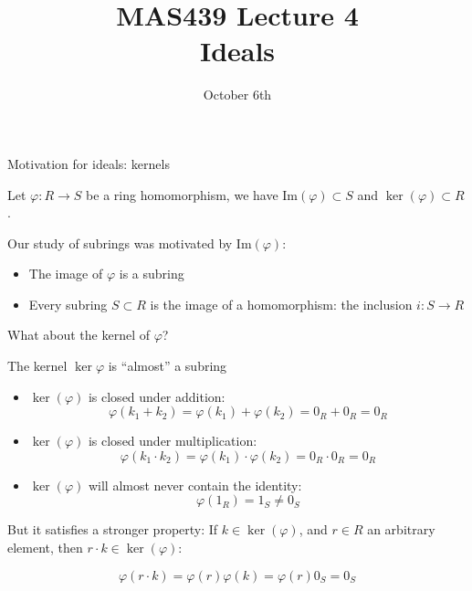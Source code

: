\documentclass{beamer}
\title{MAS439 Lecture 4 \\ Ideals}
\date{October 6th}
\begin{document}
\begin{frame}
\titlepage
\end{frame}


\begin{frame}{Motivation for ideals: kernels}

Let $\varphi:R\to S$ be a ring homomorphism, we have $\textrm{Im}(\varphi)\subset S$ and $\ker(\varphi)\subset R$.

\begin{block}{Our study of subrings was motivated by $\textrm{Im}(\varphi)$:}
\begin{itemize}
\item The image of $\varphi$ is a subring
\item Every subring $S\subset R$ is the image of a homomorphism: the inclusion $i:S\to R$
\end{itemize}
\end{block}

\begin{block}{What about the kernel of $\varphi$?}
\end{block}

\end{frame}


\begin{frame}{The kernel $\ker{\varphi}$ is ``almost'' a subring}

\begin{itemize}
\item $\ker(\varphi)$ is closed under addition: 
$$\varphi(k_1+k_2)=\varphi(k_1)+\varphi(k_2)=0_R+0_R=0_R$$
\item $\ker(\varphi)$ is closed under multiplication:
$$\varphi(k_1\cdot k_2)=\varphi(k_1)\cdot \varphi(k_2)=0_R\cdot 0_R=0_R$$
\item $\ker(\varphi)$ will \alert{almost never} contain the identity:
$$\varphi(1_R)=1_S\neq 0_S$$
\end{itemize}

\begin{block}{But it satisfies a stronger property:}
If $k\in \ker(\varphi)$, and $r\in R$ an arbitrary element, then $r\cdot k\in \ker(\varphi)$:

$$\varphi(r\cdot k)=\varphi(r)\varphi(k)=\varphi(r)0_S=0_S$$
\end{block}
\end{frame}
\end{document}
